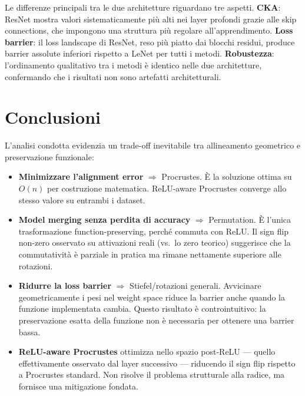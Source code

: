 \documentclass[11pt, a4paper]{article}
\begin{document}
Le differenze principali tra le due architetture riguardano tre aspetti. \textbf{CKA}: ResNet mostra valori sistematicamente più alti nei layer profondi grazie alle skip connections, che impongono una struttura più regolare all'apprendimento. \textbf{Loss barrier}: il loss landscape di ResNet, reso più piatto dai blocchi residui, produce barrier assolute inferiori rispetto a LeNet per tutti i metodi. \textbf{Robustezza}: l'ordinamento qualitativo tra i metodi è identico nelle due architetture, confermando che i risultati non sono artefatti architetturali.

\section{Conclusioni}

L'analisi condotta evidenzia un trade-off inevitabile tra allineamento geometrico e preservazione funzionale:

\begin{itemize}
    \item \textbf{Minimizzare l'alignment error} $\Rightarrow$ Procrustes. È la soluzione ottima su $O(n)$ per costruzione matematica. ReLU-aware Procrustes converge allo stesso valore su entrambi i dataset.

    \item \textbf{Model merging senza perdita di accuracy} $\Rightarrow$ Permutation. È l'unica trasformazione function-preserving, perché commuta con ReLU. Il sign flip non-zero osservato su attivazioni reali (vs.\ lo zero teorico) suggerisce che la commutatività è parziale in pratica ma rimane nettamente superiore alle rotazioni.

    \item \textbf{Ridurre la loss barrier} $\Rightarrow$ Stiefel/rotazioni generali. Avvicinare geometricamente i pesi nel weight space riduce la barrier anche quando la funzione implementata cambia. Questo risultato è controintuitivo: la preservazione esatta della funzione non è necessaria per ottenere una barrier bassa.

    \item \textbf{ReLU-aware Procrustes} ottimizza nello spazio post-ReLU — quello effettivamente osservato dal layer successivo — riducendo il sign flip rispetto a Procrustes standard. Non risolve il problema strutturale alla radice, ma fornisce una mitigazione fondata.
\end{itemize}
\end{document}
